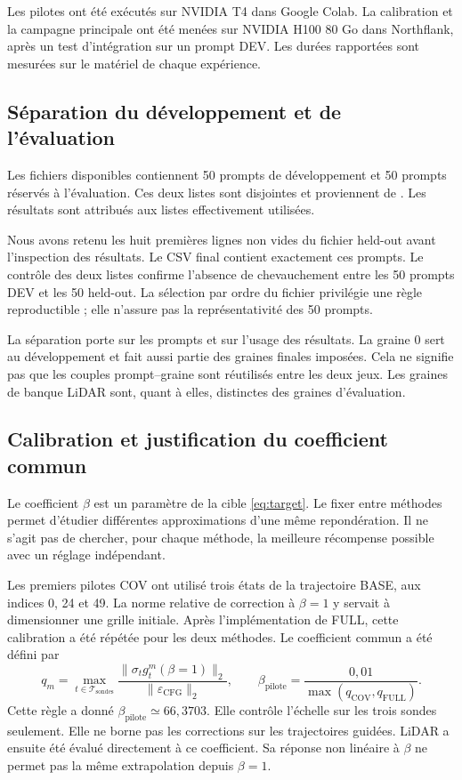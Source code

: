 \documentclass[11pt,a4paper]{article}
\newcommand{\code}[1]{\texttt{\detokenize{#1}}}
\begin{document}
Les pilotes ont été exécutés sur NVIDIA T4 dans Google Colab. La calibration et la campagne principale ont été menées sur NVIDIA H100 80 Go dans Northflank, après un test d'intégration sur un prompt DEV. Les durées rapportées sont mesurées sur le matériel de chaque expérience.

\subsection{Séparation du développement et de l'évaluation}
Les fichiers disponibles contiennent 50 prompts de développement et 50 prompts réservés à l'évaluation. Ces deux listes sont disjointes et proviennent de \code{generation_prompts.txt}. Les résultats sont attribués aux listes effectivement utilisées.

Nous avons retenu les huit premières lignes non vides du fichier held-out avant l'inspection des résultats. Le CSV final contient exactement ces prompts. Le contrôle des deux listes confirme l'absence de chevauchement entre les 50 prompts DEV et les 50 held-out. La sélection par ordre du fichier privilégie une règle reproductible ; elle n'assure pas la représentativité des 50 prompts.

La séparation porte sur les prompts et sur l'usage des résultats. La graine 0 sert au développement et fait aussi partie des graines finales imposées. Cela ne signifie pas que les couples prompt--graine sont réutilisés entre les deux jeux. Les graines de banque LiDAR sont, quant à elles, distinctes des graines d'évaluation.

\subsection{Calibration et justification du coefficient commun}
Le coefficient $\beta$ est un paramètre de la cible \eqref{eq:target}. Le fixer entre méthodes permet d'étudier différentes approximations d'une même repondération. Il ne s'agit pas de chercher, pour chaque méthode, la meilleure récompense possible avec un réglage indépendant.

Les premiers pilotes COV ont utilisé trois états de la trajectoire BASE, aux indices 0, 24 et 49. La norme relative de correction à $\beta=1$ y servait à dimensionner une grille initiale. Après l'implémentation de FULL, cette calibration a été répétée pour les deux méthodes. Le coefficient commun a été défini par
\begin{equation}\label{eq:betapilot}
q_m=\max_{t\in\mathcal T_{\mathrm{sondes}}}
\frac{\lVert\sigma_tg_t^{m}(\beta=1)\rVert_2}
{\lVert\varepsilon_{\mathrm{CFG}}\rVert_2},
\qquad \beta_{\mathrm{pilote}}=\frac{0{,}01}{\max(q_{\mathrm{COV}},q_{\mathrm{FULL}})}.
\end{equation}
Cette règle a donné $\beta_{\mathrm{pilote}}\simeq66{,}3703$. Elle contrôle l'échelle sur les trois sondes seulement. Elle ne borne pas les corrections sur les trajectoires guidées. LiDAR a ensuite été évalué directement à ce coefficient. Sa réponse non linéaire à $\beta$ ne permet pas la même extrapolation depuis $\beta=1$.
\end{document}
